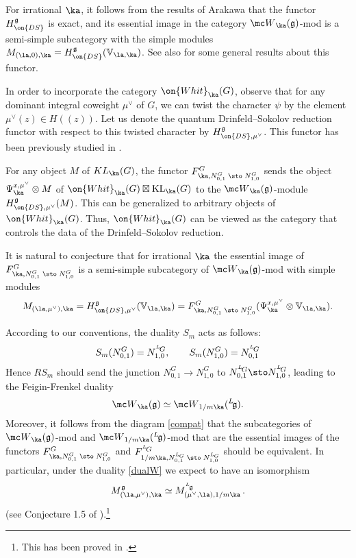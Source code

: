 \documentclass[11pt,reqno]{amsart}
\theoremstyle{plain}
\numberwithin{equation}{section}
\newcommand{\g}{\mathfrak{g}}
\def\neg{\negthinspace}
\def\lg{{}^L\neg\g}
\def\LG{{}^L\neg G}
\DeclareMathOperator{\KL}{KL}
\theoremstyle{definition}
\begin{document}
\begin{enumerate}
For irrational $\ka$, it follows from the results of Arakawa
\cite{Arakawa,Arakawa1} that the functor $H^{\g}_{\on{DS}}$ is exact,
and its essential image in the category ${\mc W}_\ka(\g)$-mod is a
semi-simple subcategory with the simple modules $M_{(\la,0),\ka} =
H^{\g}_{\on{DS}}({\mathbb V}_{\la,\ka})$. See also \cite{Raskin:w}
for some general results about this functor.

In order to incorporate the category $\on{Whit}_{\ka}(G)$, observe
that for any dominant integral coweight $\mu^\vee$ of $G$, we can
twist the character $\psi$ by the element $\mu^\vee(z) \in
H(\!(z)\!)$. Let us denote the quantum Drinfeld--Sokolov reduction
functor with respect to this twisted character by
$H^{\g}_{\on{DS},\mu^\vee}$. This functor has been previously studied
in \cite{FG,CG}.

For any object $M$ of $KL_\ka(G)$, the functor $F^G_{\ka,N^G_{0,1}\;
  \sto \; N^G_{1,0}}$ sends the object $\Psi^{x,\mu^\vee}_\ka \otimes
M$ of $\on{Whit}_{\ka}(G) \boxtimes \KL_\ka(G)$ to the ${\mc
  W}_\ka(\g)$-module $H^{\g}_{\on{DS},\mu^\vee}(M)$. This can be
generalized to arbitrary objects of $\on{Whit}_{\ka}(G)$. Thus,
$\on{Whit}_{\ka}(G)$ can be viewed as the category that controls the
data of the Drinfeld--Sokolov reduction.

It is natural to conjecture that for irrational $\ka$ the essential
image of $F^G_{\ka,N^G_{0,1}\; \sto \; N^G_{1,0}}$ is a semi-simple
subcategory of ${\mc W}_\ka(\g)$-mod with simple modules
\begin{equation}    \label{Mka}
M_{(\la,\mu^\vee),\ka} = H^{\g}_{\on{DS},\mu^\vee}({\mathbb
  V}_{\la,\ka}) = F^G_{\ka,N^G_{0,1}\; \sto \;
N^G_{1,0}}(\Psi^{x,\mu^\vee}_\ka \otimes {\mathbb
  V}_{\la,\ka}).
\end{equation}

According to our conventions, the duality $S_m$ acts as follows:
$$
S_m(N^G_{0,1}) = N^{\LG}_{1,0}, \qquad S_m(N^G_{1,0}) = N^{\LG}_{0,1}
$$
Hence $RS_m$ should send the junction $N^G_{0,1}\to N^G_{1,0}$ to
$N^{\LG}_{0,1}\sto N^{\LG}_{1,0}$, leading to the Feigin-Frenkel duality
\begin{equation}    \label{dualW}
{\mc W}_\ka(\g) \simeq {\mc W}_{1/m\ka}(\lg).
\end{equation}
Moreover, it follows from the diagram \eqref{compat} that the
subcategories of ${\mc W}_\ka(\g)$-mod and ${\mc W}_{1/m\ka}(\lg)$-mod
that are the essential images of the functors $F^G_{\ka,N^G_{0,1}\;
  \sto \; N^G_{1,0}}$ and $F^{\LG}_{1/m\ka,N^{\LG}_{0,1}\; \sto \;
  N^{\LG}_{1,0}}$ should be equivalent. In particular, under the
duality \eqref{dualW} we expect to have an isomorphism
\begin{equation}
M^{\g}_{(\la,\mu^\vee),\ka} \simeq M^{\lg}_{(\mu^\vee,\la),1/m\ka} \, .
\end{equation}
(see Conjecture 1.5 of \cite{CG}).\footnote{This has been proved in
  \cite{AF}.}


\end{enumerate}
\end{document}
